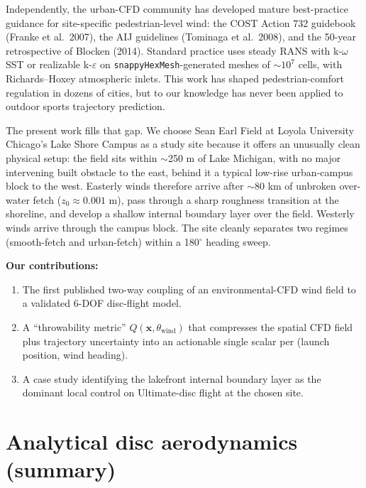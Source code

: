 \documentclass[11pt,letterpaper]{article}
\begin{document}
Independently, the urban-CFD community has developed mature best-practice guidance for site-specific pedestrian-level wind: the COST Action 732 guidebook (Franke et al.\ 2007), the AIJ guidelines (Tominaga et al.\ 2008), and the 50-year retrospective of Blocken (2014). Standard practice uses steady RANS with k-$\omega$ SST or realizable k-$\varepsilon$ on \texttt{snappyHexMesh}-generated meshes of $\sim 10^7$ cells, with Richards--Hoxey atmospheric inlets. This work has shaped pedestrian-comfort regulation in dozens of cities, but to our knowledge has never been applied to outdoor sports trajectory prediction.

The present work fills that gap. We choose Sean Earl Field at Loyola University Chicago's Lake Shore Campus as a study site because it offers an unusually clean physical setup: the field sits within $\sim$250 m of Lake Michigan, with no major intervening built obstacle to the east, behind it a typical low-rise urban-campus block to the west. Easterly winds therefore arrive after $\sim$80 km of unbroken over-water fetch ($z_0 \approx 0.001$ m), pass through a sharp roughness transition at the shoreline, and develop a shallow internal boundary layer over the field. Westerly winds arrive through the campus block. The site cleanly separates two regimes (smooth-fetch and urban-fetch) within a 180$^\circ$ heading sweep.

\textbf{Our contributions:}
\begin{enumerate}[leftmargin=*,itemsep=2pt]
  \item The first published two-way coupling of an environmental-CFD wind field to a validated 6-DOF disc-flight model.
  \item A ``throwability metric'' $Q(\mathbf{x}, \theta_{\text{wind}})$ that compresses the spatial CFD field plus trajectory uncertainty into an actionable single scalar per (launch position, wind heading).
  \item A case study identifying the lakefront internal boundary layer as the dominant local control on Ultimate-disc flight at the chosen site.
\end{enumerate}

\section{Analytical disc aerodynamics (summary)}
\end{document}
